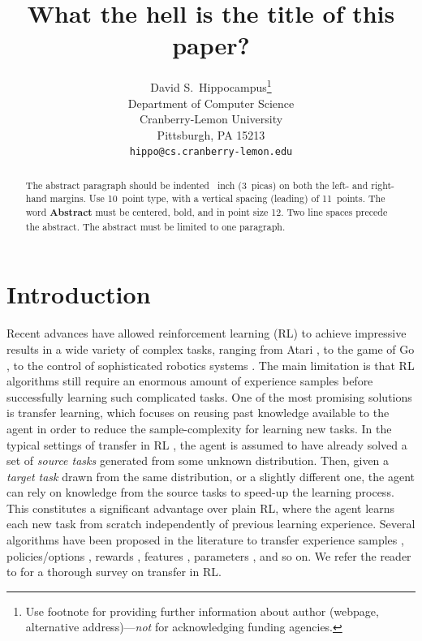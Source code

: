 \documentclass{article}
\title{What the hell is the title of this paper?}
\author{
  David S.~Hippocampus\thanks{Use footnote for providing further
    information about author (webpage, alternative
    address)---\emph{not} for acknowledging funding agencies.} \\
  Department of Computer Science\\
  Cranberry-Lemon University\\
  Pittsburgh, PA 15213 \\
  \texttt{hippo@cs.cranberry-lemon.edu} \\
}
\begin{document}

\maketitle

\begin{abstract}
  The abstract paragraph should be indented ~inch
  (3~picas) on both the left- and right-hand margins. Use 10~point
  type, with a vertical spacing (leading) of 11~points.  The word
  \textbf{Abstract} must be centered, bold, and in point size 12. Two
  line spaces precede the abstract. The abstract must be limited to
  one paragraph.
\end{abstract}

\section{Introduction}

Recent advances have allowed reinforcement learning (RL) \cite{sutton1998reinforcement} to achieve impressive results in a wide variety of complex tasks, ranging from Atari \cite{mnih2015human}, to the game of Go \cite{silver2016mastering}, to the control of sophisticated robotics systems \cite{kober2009policy,lillicrap2015continuous,levine2016end}. The main limitation is that RL algorithms still require an enormous amount of experience samples before successfully learning such complicated tasks. One of the most promising solutions is transfer learning, which focuses on reusing past knowledge available to the agent in order to reduce the sample-complexity for learning new tasks. In the typical settings of transfer in RL \cite{taylor2009transfer}, the agent is assumed to have already solved a set of \textit{source tasks} generated from some unknown distribution. Then, given a \textit{target task} drawn from the same distribution, or a slightly different one, the agent can rely on knowledge from the source tasks to speed-up the learning process. This constitutes a significant advantage over plain RL, where the agent learns each new task from scratch independently of previous learning experience. Several algorithms have been proposed in the literature to transfer experience samples \cite{lazaric2008transfer,taylor2008transferring}, policies/options \cite{fernandez2006probabilistic,konidaris2007building}, rewards \cite{konidaris2006autonomous}, features \cite{barreto2017successor}, parameters \cite{doshi2016hidden,killian2017robust}, and so on. We refer the reader to \cite{taylor2009transfer} for a thorough survey on transfer in RL.
\end{document}
